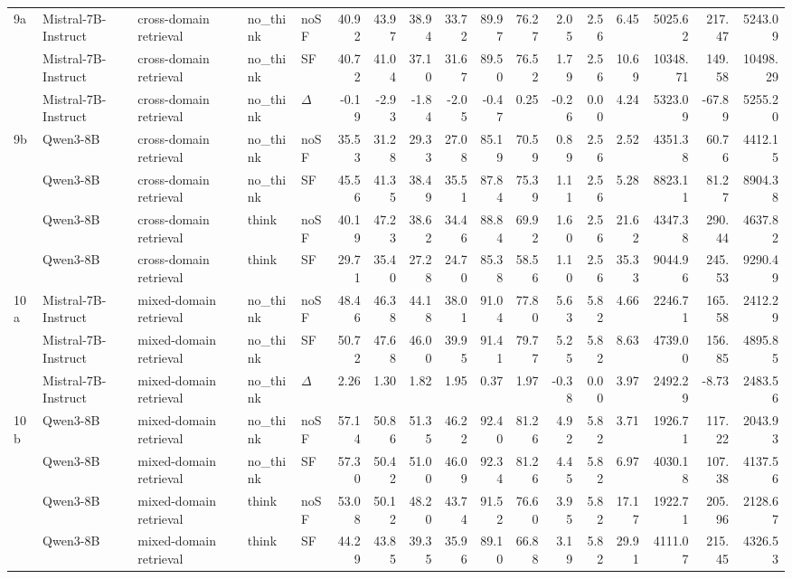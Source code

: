 \begin{landscape}
\begin{footnotesize}
\begin{longtable}{l l l l l r r r r r r r r r r r r}
\midrule
9a & Mistral-7B-Instruct & cross-domain retrieval & no\_think & noSF & 40.92 & 43.97 & 38.94 & 33.72 & 89.97 & 76.27 & 2.05 & 2.56 & 6.45 & 5025.62 & 217.47 & 5243.09 \\
 & Mistral-7B-Instruct & cross-domain retrieval & no\_think & SF & 40.72 & 41.04 & 37.10 & 31.67 & 89.50 & 76.52 & 1.79 & 2.56 & 10.69 & 10348.71 & 149.58 & 10498.29 \\
 & Mistral-7B-Instruct & cross-domain retrieval & no\_think & $\Delta$ & -0.19 & -2.93 & -1.84 & -2.05 & -0.47 & 0.25 & -0.26 & 0.00 & 4.24 & 5323.09 & -67.89 & 5255.20 \\
9b & Qwen3-8B & cross-domain retrieval & no\_think & noSF & 35.53 & 31.28 & 29.33 & 27.08 & 85.19 & 70.59 & 0.89 & 2.56 & 2.52 & 4351.38 & 60.76 & 4412.15 \\
 & Qwen3-8B & cross-domain retrieval & no\_think & SF & 45.56 & 41.35 & 38.49 & 35.51 & 87.84 & 75.39 & 1.11 & 2.56 & 5.28 & 8823.11 & 81.27 & 8904.38 \\
 & Qwen3-8B & cross-domain retrieval & think & noSF & 40.19 & 47.23 & 38.62 & 34.46 & 88.84 & 69.92 & 1.60 & 2.56 & 21.62 & 4347.38 & 290.44 & 4637.82 \\
 & Qwen3-8B & cross-domain retrieval & think & SF & 29.71 & 35.40 & 27.28 & 24.70 & 85.38 & 58.56 & 1.10 & 2.56 & 35.33 & 9044.96 & 245.53 & 9290.49 \\
\midrule
10a & Mistral-7B-Instruct & mixed-domain retrieval & no\_think & noSF & 48.46 & 46.38 & 44.18 & 38.01 & 91.04 & 77.80 & 5.63 & 5.82 & 4.66 & 2246.71 & 165.58 & 2412.29 \\
 & Mistral-7B-Instruct & mixed-domain retrieval & no\_think & SF & 50.72 & 47.68 & 46.00 & 39.95 & 91.41 & 79.77 & 5.25 & 5.82 & 8.63 & 4739.00 & 156.85 & 4895.85 \\
 & Mistral-7B-Instruct & mixed-domain retrieval & no\_think & $\Delta$ & 2.26 & 1.30 & 1.82 & 1.95 & 0.37 & 1.97 & -0.38 & 0.00 & 3.97 & 2492.29 & -8.73 & 2483.56 \\
10b & Qwen3-8B & mixed-domain retrieval & no\_think & noSF & 57.14 & 50.86 & 51.35 & 46.22 & 92.40 & 81.26 & 4.92 & 5.82 & 3.71 & 1926.71 & 117.22 & 2043.93 \\
 & Qwen3-8B & mixed-domain retrieval & no\_think & SF & 57.30 & 50.42 & 51.00 & 46.09 & 92.34 & 81.26 & 4.45 & 5.82 & 6.97 & 4030.18 & 107.38 & 4137.56 \\
 & Qwen3-8B & mixed-domain retrieval & think & noSF & 53.08 & 50.12 & 48.20 & 43.74 & 91.52 & 76.60 & 3.95 & 5.82 & 17.17 & 1922.71 & 205.96 & 2128.67 \\
 & Qwen3-8B & mixed-domain retrieval & think & SF & 44.29 & 43.85 & 39.35 & 35.96 & 89.10 & 66.88 & 3.19 & 5.82 & 29.91 & 4111.07 & 215.45 & 4326.53 \\
\end{longtable}
\end{footnotesize}
\end{landscape}
